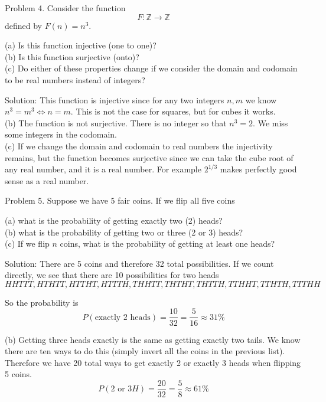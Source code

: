 \documentclass[16 pt]{amsart}
\theoremstyle{definition}
\theoremstyle{remark}
\numberwithin{equation}{subsection}
\newcommand{\Z}{\mathbb{Z}}
\begin{document}
Problem 4.  Consider the function
\[
F: \Z \rightarrow \Z
\]
defined by $F(n) = n^3$.

(a) Is this function injective (one to one)?\\

(b) Is this function surjective (onto)?\\

(c) Do either of these properties change if we consider the domain and codomain to be real numbers instead of integers?


\vspace{1in}

Solution: This function is injective since for any two integers $n,m$ we know $n^3=m^3 \iff n=m$.  This is not the case for squares, but for cubes it works.\\

(b) The function is not surjective.  There is no integer so that $n^3=2$.  We miss some integers in the codomain.\\

(c) If we change the domain and codomain to real numbers the injectivity remains, but the function becomes surjective since we can take the cube root of any real number, and it is a real number.  For example $2^{1/3}$ makes perfectly good sense as a real number.



\newpage

Problem 5. Suppose we have 5 fair coins.  If we flip all five coins 

(a) what is the probability of getting exactly two (2) heads?\\

(b) what is the probability of getting two or three (2 or 3) heads?\\

(c) If we flip $n$ coins, what is the probability of getting at least one heads?


\vspace{1in}

Solution: There are 5 coins and therefore 32 total possibilities.  If we count directly, we see that there are 10 possibilities for two heads
\[
HHTTT, HTHTT, HTTHT, HTTTH, THHTT, THTHT, THTTH, TTHHT, TTHTH, TTTHH
\]

So the probability is 
\[
P(\text{exactly 2 heads}) = \frac{10}{32} = \frac{5}{16} \approx 31 \%
\]

(b) Getting three heads exactly is the same as getting exactly two tails.  We know there are ten ways to do this (simply invert all the coins in the previous list).  Therefore we have 20 total ways to get exactly 2 or exactly 3 heads when flipping 5 coins.
\[
P(2 \text{ or } 3 H) = \frac{20}{32} = \frac{5}{8} \approx 61 \%
\]
\end{document}
